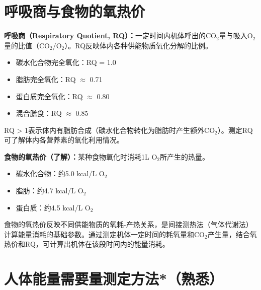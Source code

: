 \section{呼吸商与食物的氧热价}

\begin{defbox}
\textbf{呼吸商（Respiratory Quotient, RQ）：}一定时间内机体呼出的CO$_2$量与吸入O$_2$量的比值（CO$_2$/O$_2$）。RQ反映体内各种供能物质氧化分解的比例。
\begin{itemize}[leftmargin=*]
    \item 碳水化合物完全氧化：RQ = 1.0
    \item 脂肪完全氧化：RQ $\approx$ 0.71
    \item 蛋白质完全氧化：RQ $\approx$ 0.80
    \item 混合膳食：RQ $\approx$ 0.85
\end{itemize}
RQ > 1表示体内有脂肪合成（碳水化合物转化为脂肪时产生额外CO$_2$）。测定RQ可了解体内各营养素的氧化利用情况。
\end{defbox}

\begin{tipbox}
\textbf{食物的氧热价（了解）：}某种食物氧化时消耗1L O$_2$所产生的热量。
\begin{itemize}[leftmargin=*]
    \item 碳水化合物：约5.0 kcal/L O$_2$
    \item 脂肪：约4.7 kcal/L O$_2$
    \item 蛋白质：约4.5 kcal/L O$_2$
\end{itemize}
食物的氧热价反映不同供能物质的氧耗-产热关系，是间接测热法（气体代谢法）计算能量消耗的基础参数。通过测定机体一定时间的耗氧量和CO$_2$产生量，结合氧热价和RQ，可计算出机体在该段时间内的能量消耗。
\end{tipbox}

\section{人体能量需要量测定方法*（熟悉）}

